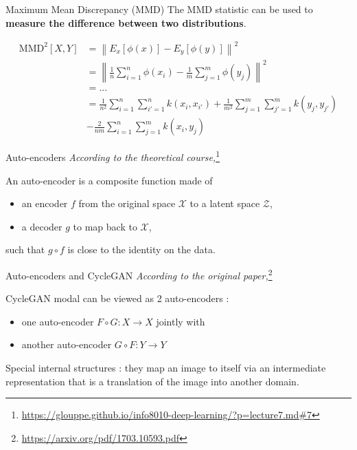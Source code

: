 \documentclass[12pt]{beamer}
\begin{document}
    \begin{frame}{Maximum Mean Discrepancy (MMD)}
        The MMD statistic can be used to \textbf{measure the difference between two distributions}.
        
        \footnotesize{
            \begin{align*}
                \text{MMD}^{2}[X, Y] &= \left\|E_{x}[\phi(x)]-E_{y}[\phi(y)]\right\|^{2}\\
                &= \left\|\frac{1}{n} \sum_{i=1}^{n} \phi\left(x_{i}\right)-\frac{1}{m} \sum_{j=1}^{m} \phi\left(y_{j}\right)\right\|^{2}\\
                &= ...\\
                &= \frac{1}{n^2}\sum_{i=1}^n\sum_{i'=1}^n k(x_i, x_{i'}) + \frac{1}{m^2}\sum_{j=1}^m\sum_{j'=1}^m k(y_j, y_{j'})\\
                &- \frac{2}{nm}\sum_{i=1}^n\sum_{j=1}^m k(x_i, y_{j})
            \end{align*}
        }
    \end{frame}
    
    \begin{frame}{Auto-encoders}
        \footnotesize{\emph{According to the theoretical course,}}\footnote{\url{https://glouppe.github.io/info8010-deep-learning/?p=lecture7.md\#7}}
        
        \normalsize{
            An auto-encoder is a composite function made of
            
            \begin{itemize}
                \item an encoder $f$ from the original space $\mathcal{X}$ to a latent space $\mathcal{Z}$,
                \item a decoder $g$ to map back to $\mathcal{X}$,
            \end{itemize}
            
            such that $g \circ f$ is close to the identity on the data.
        }
    \end{frame}
    
    \begin{frame}{Auto-encoders and CycleGAN}
        \footnotesize{\emph{According to the original paper,}}\footnote{\url{https://arxiv.org/pdf/1703.10593.pdf}}
        
        \normalsize{
            CycleGAN modal can be viewed as 2 auto-encoders :
            
            \begin{itemize}
                \item one auto-encoder $F \circ G : X \rightarrow X$ jointly with
                \item another auto-encoder $G \circ F : Y \rightarrow Y$
            \end{itemize}
        }
        
        \scriptsize{Special internal structures : they map an image to itself via an intermediate representation that is a translation of the image into another domain.}
    \end{frame}
    
\end{document}
